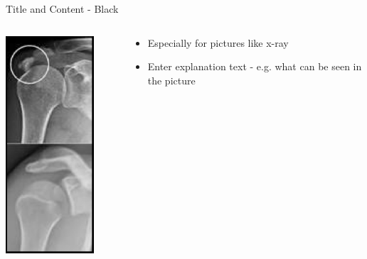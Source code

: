 \documentclass[10pt]{beamer} %
\begin{document}
{\begin{frame}{Title and Content - Black}
\begin{columns}
\begin{column}{0.3\textwidth}
\begin{center}
     \includegraphics[width=0.8\textwidth]{Images/xray.png}
     \end{center}
  \end{column}
  \begin{column}{0.7\textwidth}  %
    \begin{itemize}
	  \item Especially for pictures like x-ray
	  \item Enter explanation text - e.g. what can be seen in the picture
	\end{itemize}
  \end{column}
\end{columns}

\end{frame}
}
\end{document}
